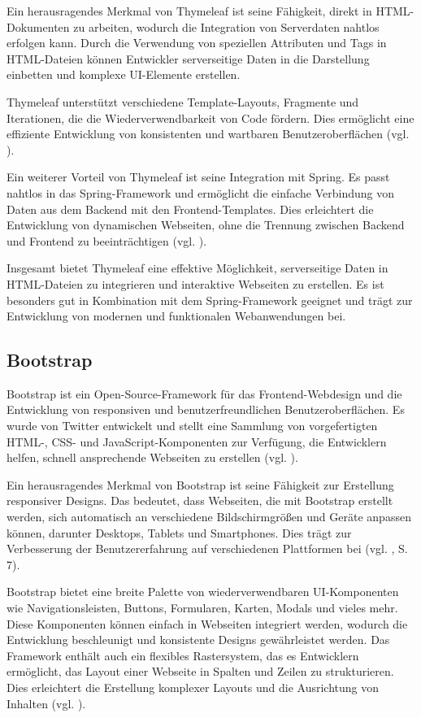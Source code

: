 \documentclass[fontsize=12pt,openright,oneside,paper=a4,BCOR=1cm]{scrbook}
\begin{document}
Ein herausragendes Merkmal von Thymeleaf ist seine Fähigkeit, direkt in HTML-Dokumenten zu arbeiten, wodurch die Integration von Serverdaten nahtlos erfolgen kann. Durch die Verwendung von speziellen Attributen und Tags in HTML-Dateien können Entwickler serverseitige Daten in die Darstellung einbetten und komplexe UI-Elemente erstellen.

Thymeleaf unterstützt verschiedene Template-Layouts, Fragmente und Iterationen, die die Wiederverwendbarkeit von Code fördern. Dies ermöglicht eine effiziente Entwicklung von konsistenten und wartbaren Benutzeroberflächen (vgl. \cite{thymeleaf}).

Ein weiterer Vorteil von Thymeleaf ist seine Integration mit Spring. Es passt nahtlos in das Spring-Framework und ermöglicht die einfache Verbindung von Daten aus dem Backend mit den Frontend-Templates. Dies erleichtert die Entwicklung von dynamischen Webseiten, ohne die Trennung zwischen Backend und Frontend zu beeinträchtigen (vgl. \cite{thymeleafspring}). 

Insgesamt bietet Thymeleaf eine effektive Möglichkeit, serverseitige Daten in HTML-Dateien zu integrieren und interaktive Webseiten zu erstellen. Es ist besonders gut in Kombination mit dem Spring-Framework geeignet und trägt zur Entwicklung von modernen und funktionalen Webanwendungen bei.

\subsection{Bootstrap}

Bootstrap ist ein Open-Source-Framework für das Frontend-Webdesign und die Entwicklung von responsiven und benutzerfreundlichen Benutzeroberflächen. Es wurde von Twitter entwickelt und stellt eine Sammlung von vorgefertigten HTML-, CSS- und JavaScript-Komponenten zur Verfügung, die Entwicklern helfen, schnell ansprechende Webseiten zu erstellen (vgl. \cite{twitterbootstrap}).

Ein herausragendes Merkmal von Bootstrap ist seine Fähigkeit zur Erstellung responsiver Designs. Das bedeutet, dass Webseiten, die mit Bootstrap erstellt werden, sich automatisch an verschiedene Bildschirmgrößen und Geräte anpassen können, darunter Desktops, Tablets und Smartphones. Dies trägt zur Verbesserung der Benutzererfahrung auf verschiedenen Plattformen bei (vgl. \cite{spurlock2013bootstrap}, S. 7).

Bootstrap bietet eine breite Palette von wiederverwendbaren UI-Komponenten wie Navigationsleisten, Buttons, Formularen, Karten, Modals und vieles mehr. Diese Komponenten können einfach in Webseiten integriert werden, wodurch die Entwicklung beschleunigt und konsistente Designs gewährleistet werden.
Das Framework enthält auch ein flexibles Rastersystem, das es Entwicklern ermöglicht, das Layout einer Webseite in Spalten und Zeilen zu strukturieren. Dies erleichtert die Erstellung komplexer Layouts und die Ausrichtung von Inhalten (vgl. \cite{bootstrapgrid}).
\end{document}
